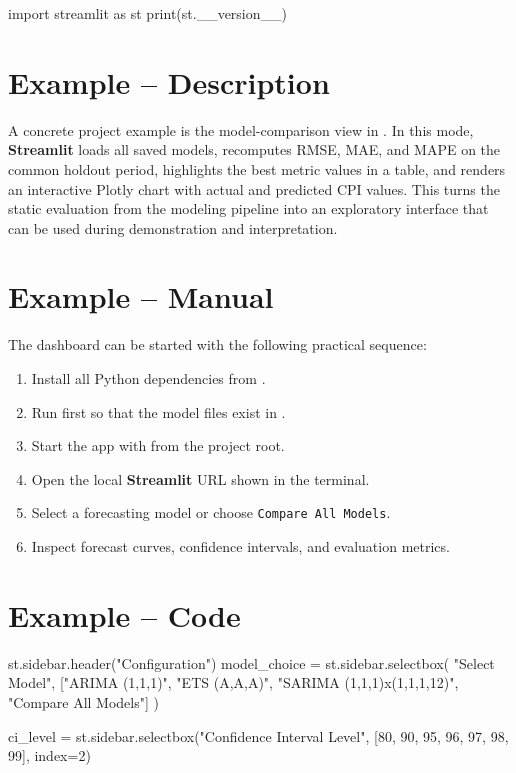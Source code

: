 \begin{Python}[caption={Verifying the Streamlit installation}, label={lst:verify_streamlit}]
import streamlit as st
print(st.__version__)
\end{Python}

\section{Example -- Description}

A concrete project example is the model-comparison view in . In this mode, \textbf{Streamlit} loads all saved models, recomputes RMSE, MAE, and MAPE on the common holdout period, highlights the best metric values in a table, and renders an interactive Plotly chart with actual and predicted CPI values. This turns the static evaluation from the modeling pipeline into an exploratory interface that can be used during demonstration and interpretation.

\section{Example -- Manual}

The dashboard can be started with the following practical sequence:

\begin{enumerate}
    \item Install all Python dependencies from .
    \item Run  first so that the model files exist in .
    \item Start the app with  from the project root.
    \item Open the local \textbf{Streamlit} URL shown in the terminal.
    \item Select a forecasting model or choose \texttt{Compare All Models}.
    \item Inspect forecast curves, confidence intervals, and evaluation metrics.
\end{enumerate}

\section{Example -- Code}

\begin{Python}[caption={Typical Streamlit controls used in the CPI dashboard}, label={lst:streamlit_project_code}]
st.sidebar.header("Configuration")
model_choice = st.sidebar.selectbox(
    "Select Model",
    ["ARIMA (1,1,1)", "ETS (A,A,A)", "SARIMA (1,1,1)x(1,1,1,12)", "Compare All Models"]
)

ci_level = st.sidebar.selectbox("Confidence Interval Level", [80, 90, 95, 96, 97, 98, 99], index=2)
\end{Python}

